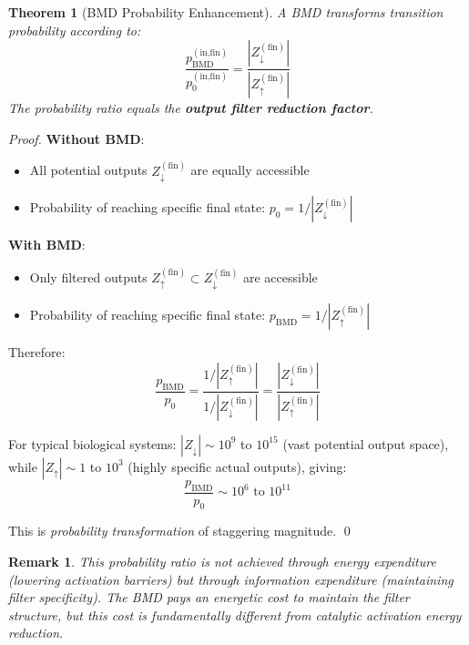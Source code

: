\documentclass[12pt,a4paper]{article}
\newtheorem{theorem}{Theorem}
\newtheorem{remark}{Remark}
\begin{document}
\begin{theorem}[BMD Probability Enhancement]
\label{thm:bmd_probability}
A BMD transforms transition probability according to:
\begin{equation}
\frac{p_{\text{BMD}}^{(\text{in,fin})}}{p_0^{(\text{in,fin})} } = \frac{|Z_{\downarrow}^{(\text{fin})}|}{|Z_{\uparrow}^{(\text{fin})}|}
\end{equation}
The probability ratio equals the \textbf{output filter reduction factor}.
\end{theorem}

\begin{proof}
\textbf{Without BMD}:
\begin{itemize}
\item All potential outputs $Z_{\downarrow}^{(\text{fin})}$ are equally accessible
\item Probability of reaching specific final state: $p_0 = 1/|Z_{\downarrow}^{(\text{fin})}|$
\end{itemize}

\textbf{With BMD}:
\begin{itemize}
\item Only filtered outputs $Z_{\uparrow}^{(\text{fin})} \subset Z_{\downarrow}^{(\text{fin})}$ are accessible
\item Probability of reaching specific final state: $p_{\text{BMD}} = 1/|Z_{\uparrow}^{(\text{fin})}|$
\end{itemize}

Therefore:
\begin{equation}
\frac{p_{\text{BMD}}}{p_0} = \frac{1/|Z_{\uparrow}^{(\text{fin})}|}{1/|Z_{\downarrow}^{(\text{fin})}|} = \frac{|Z_{\downarrow}^{(\text{fin})}|}{|Z_{\uparrow}^{(\text{fin})}|}
\end{equation}

For typical biological systems: $|Z_{\downarrow}| \sim 10^{9}$ to $10^{15}$ (vast potential output space), while $|Z_{\uparrow}| \sim 1$ to $10^3$ (highly specific actual outputs), giving:
\begin{equation}
\frac{p_{\text{BMD}}}{p_0} \sim 10^6 \text{ to } 10^{11}
\end{equation}

This is \textit{probability transformation} of staggering magnitude. \qed
\end{proof}

\begin{remark}
This probability ratio is \textit{not} achieved through energy expenditure (lowering activation barriers) but through \textit{information expenditure} (maintaining filter specificity). The BMD pays an energetic cost to maintain the filter structure, but this cost is fundamentally different from catalytic activation energy reduction.
\end{remark}
\end{document}
